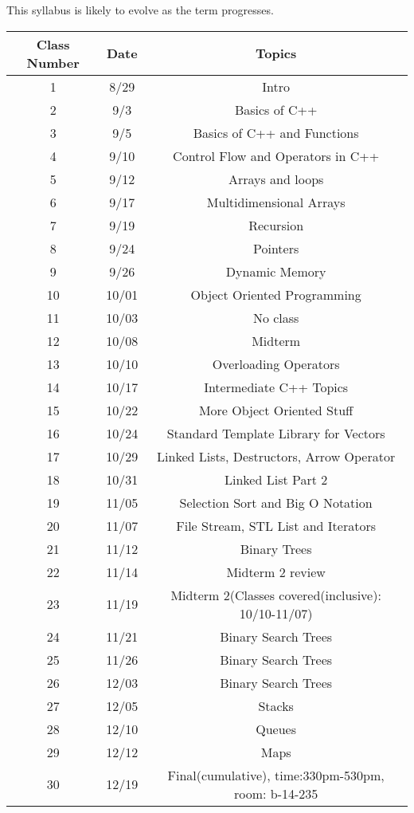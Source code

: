 \documentclass[a4paper]{article}
\begin{document}
This syllabus is likely to evolve as the term progresses.
\begin{center}
    \begin{tabular}{||c c c ||} 
     \hline
     Class Number & Date & Topics  \\ [0.5ex] 
     \hline\hline
     1 & 8/29 & Intro  \\ 
     \hline
     2 & 9/3 & Basics of C++  \\
     \hline
     3 & 9/5 & Basics of C++ and Functions \\
     \hline
     4 & 9/10 & Control Flow and Operators in C++  \\
     \hline
     5 & 9/12 & Arrays and loops \\
     \hline
     6 & 9/17 & Multidimensional Arrays \\
     \hline
     7 & 9/19 & Recursion\\
     \hline
     8 & 9/24 &  Pointers  \\
     \hline
     9 & 9/26 & Dynamic Memory \\ 
     \hline
     10 & 10/01 & Object Oriented Programming  \\
     \hline
     11 & 10/03 & No class \\
     \hline
     12 & 10/08 & Midterm \\ 
     \hline
     13 & 10/10 & Overloading Operators \\ 
     \hline
     14 & 10/17 & Intermediate C++ Topics \\ 
     \hline
     15 & 10/22 & More Object Oriented Stuff \\ 
     \hline
     16 & 10/24 & Standard Template Library for Vectors\\ 
     \hline
     17 & 10/29 & Linked Lists, Destructors, Arrow Operator \\ 
     \hline
     18 & 10/31 & Linked List Part 2 \\ 
     \hline
     19 & 11/05 &  Selection Sort and Big O Notation \\ 
     \hline
     20 & 11/07 & File Stream, STL List and Iterators \\ 
     \hline
     21 & 11/12 &  Binary Trees\\
     \hline
     22 & 11/14 & Midterm 2 review \\ 
     \hline
     23 & 11/19 & Midterm 2(Classes covered(inclusive): 10/10-11/07) \\
     \hline
     24 & 11/21 & Binary Search Trees \\ 
     \hline
     25 & 11/26 & Binary Search Trees \\ 
     \hline
     26 & 12/03 & Binary Search Trees \\ 
     \hline
     27 & 12/05 & Stacks \\ 
     \hline
     28 & 12/10 & Queues \\ 
     \hline
     29 & 12/12 & Maps \\
     \hline
     30 & 12/19 & Final(cumulative), time:330pm-530pm, room: b-14-235 \\ [1ex]
     \hline
    \end{tabular}
    \end{center}
\end{document}
